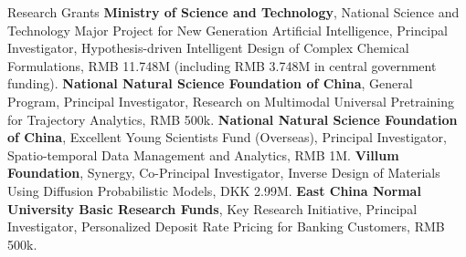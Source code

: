 \begin{rubric}{Research Grants}
\entry*[2026.08 -- 2028.08]%
		\textbf{Ministry of Science and Technology}, National Science and Technology Major Project for New Generation Artificial Intelligence, Principal Investigator, Hypothesis-driven Intelligent Design of Complex Chemical Formulations, RMB 11.748M (including RMB 3.748M in central government funding).
\entry*[2025 -- 2028]%
	\textbf{National Natural Science Foundation of China}, General Program, Principal Investigator, Research on Multimodal Universal Pretraining for Trajectory Analytics, RMB 500k.
\entry*[2023 -- 2026]%
    \textbf{National Natural Science Foundation of China}, Excellent Young Scientists Fund (Overseas), Principal Investigator, Spatio-temporal Data Management and Analytics, RMB 1M.
\entry*[2024 -- 2026]%
	\textbf{Villum Foundation}, Synergy, Co-Principal Investigator, Inverse Design of Materials Using Diffusion Probabilistic Models, DKK 2.99M.
\entry*[2023 -- 2026]%
	\textbf{East China Normal University Basic Research Funds}, Key Research Initiative, Principal Investigator, Personalized Deposit Rate Pricing for Banking Customers, RMB 500k.
\end{rubric}
